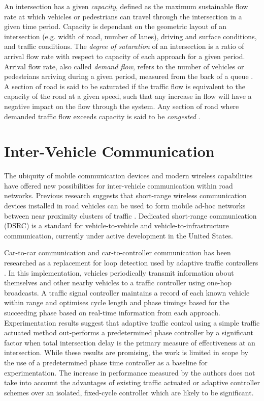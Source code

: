 \begin{appendices}
An intersection has a given \emph{capacity}, defined as the maximum sustainable flow rate at which vehicles or pedestrians can travel through the intersection in a given time period. Capacity is dependant on the geometric layout of an intersection (e.g. width of road, number of lanes), driving and surface conditions, and traffic conditions. The \emph{degree of saturation} of an intersection is a ratio of arrival flow rate with respect to capacity of each approach for a given period. Arrival flow rate, also called \emph{demand flow}, refers to the number of vehicles or pedestrians arriving during a given period, measured from the back of a queue \cite{sidraglossary}. A section of road is said to be saturated if the traffic flow is equivalent to the capacity of the road at a given speed, such that any increase in flow will have a negative impact on the flow through the system. Any section of road where demanded traffic flow exceeds capacity is said to be \emph{congested} \cite{wallis2013costs}.

\chapter{Inter-Vehicle Communication}
\label{appendix:inter-vehicle-comms}

The ubiquity of mobile communication devices and modern wireless capabilities have offered new possibilities for inter-vehicle communication within road networks. Previous research suggests that short-range wireless communication devices installed in road vehicles can be used to form mobile ad-hoc networks between near proximity clusters of traffic \cite{adaptive2007grad,nadeem2004trafficview,yang2004vehicle}. Dedicated short-range communication (DSRC) is a standard for vehicle-to-vehicle and vehicle-to-infrastructure communication, currently under active development in the United States\cite{dsrc2011}.

Car-to-car communication and car-to-controller communication has been researched as a replacement for loop detection used by adaptive traffic controllers \cite{adaptive2007grad}. In this implementation, vehicles periodically transmit information about themselves and other nearby vehicles to a traffic controller using one-hop broadcasts. A traffic signal controller maintains a record of each known vehicle within range and optimises cycle length and phase timings based for the succeeding phase based on real-time information from each approach. Experimentation results suggest that adaptive traffic control using a simple traffic actuated method out-performs a predetermined phase controller by a significant factor when total intersection delay is the primary measure of effectiveness at an intersection. While these results are promising, the work is limited in scope by the use of a predetermined phase time controller as a baseline for experimentation. The increase in performance measured by the authors does not take into account the advantages of existing traffic actuated or adaptive controller schemes over an isolated, fixed-cycle controller which are likely to be significant. 


\end{appendices}

